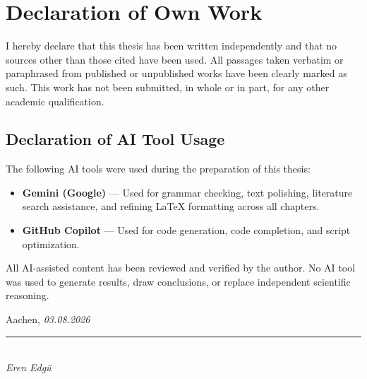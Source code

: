 \ifmasterthesis
\else\ifbachelorthesis
\else

\chapter*{Declaration of Own Work}

I hereby declare that this thesis has been written independently and that no sources other than those cited have been used. All passages taken verbatim or paraphrased from published or unpublished works have been clearly marked as such. This work has not been submitted, in whole or in part, for any other academic qualification.

\fi\fi

\section*{Declaration of AI Tool Usage}

The following AI tools were used during the preparation of this thesis:

\begin{itemize}
  \item \textbf{Gemini (Google)} — Used for grammar checking, text polishing, literature search assistance, and refining LaTeX formatting across all chapters.
  \item \textbf{GitHub Copilot} — Used for code generation, code completion, and script optimization.
\end{itemize}

\noindent
All AI-assisted content has been reviewed and verified by the author. No AI tool was used to generate results, draw conclusions, or replace independent scientific reasoning.

\vspace{2cm}

\noindent
Aachen, \textit{03.08.2026}

\vspace{1.5cm}

\noindent
\rule{0.4\textwidth}{0.4pt}\\
\textit{Eren Edgü}
